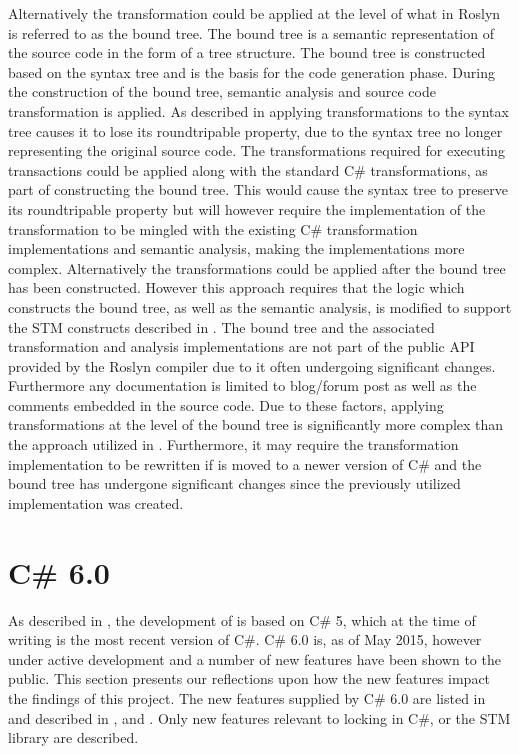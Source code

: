 Alternatively the transformation could be applied at the level of what in Roslyn is referred to as the bound tree. The bound tree is a semantic representation of the source code in the form of a tree structure. The bound tree is constructed based on the syntax tree and is the basis for the code generation phase. During the construction of the bound tree, semantic analysis and source code transformation is applied. As described in  applying transformations to the syntax tree causes it to lose its roundtripable property, due to the syntax tree no longer representing the original \stmname source code. The transformations required for executing transactions could be applied along with the standard C\# transformations, as part of constructing the bound tree. This would cause the syntax tree to preserve its roundtripable property but will however require the implementation of the transformation to be mingled with the existing C\# transformation implementations and semantic analysis, making the implementations more complex. Alternatively the transformations could be applied after the bound tree has been constructed. However this approach requires that the logic which constructs the bound tree, as well as the semantic analysis, is modified to support the \ac{STM} constructs described in . The bound tree and the associated transformation and analysis implementations are not part of the public \ac{API} provided by the Roslyn compiler due to it often undergoing significant changes\cite{roslynBinder}. Furthermore any documentation is limited to blog/forum post as well as the comments embedded in the source code. Due to these factors, applying transformations at the level of the bound tree is significantly more complex than the approach utilized in . Furthermore, it may require the transformation implementation to be rewritten if \stmname is moved to a newer version of C\# and the bound tree has undergone significant changes since the previously utilized implementation was created.

\section{C\# 6.0}\label{sec:reflection_csharpsix}
As described in , the development of \stmname is based on C\# 5, which at the time of writing is the most recent version of C\#. C\# 6.0 is, as of May 2015, however under active development and a number of new features have been shown to the public. This section presents our reflections upon how the new features impact the findings of this project. The new features supplied by C\# 6.0 are listed in \cite{csharp6Features} and described in \cite{csharp6one}, \cite{csharp6two} and \cite{csharp6featureDescription}. Only new features relevant to locking in C\#, \stmname or the \ac{STM} library are described.


